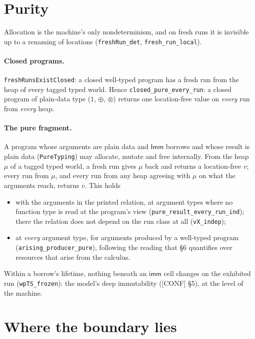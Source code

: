 \documentclass[10pt]{article}
\newcommand{\lean}[1]{\texttt{#1}}
\begin{document}
\section{Purity}

Allocation is the machine's only nondeterminism, and on fresh runs it is invisible up to a
renaming of locations (\lean{freshRun\_det}, \lean{fresh\_run\_local}).

\paragraph{Closed programs.} \lean{freshRunsExistClosed}: a closed well-typed program has a fresh
run from the heap of every tagged typed world. Hence \lean{closed\_pure\_every\_run}: a closed
program of plain-data type ($1$, $\oplus$, $\otimes$) returns one location-free value on
\emph{every} run from \emph{every} heap.

\paragraph{The pure fragment.} A program whose arguments are plain data and $\mathsf{Imm}$
borrows and whose result is plain data (\lean{PureTyping}) may allocate, mutate and free
internally. From the heap $\mu$ of a tagged typed world, a fresh run gives $\mu$ back and
returns a location-free $v$; every run from $\mu$, and every run from any heap agreeing with
$\mu$ on what the arguments reach, returns $v$. This holds
\begin{itemize}
\item with the arguments in the printed relation, at argument types where no function type is
  read at the program's view (\lean{pure\_result\_every\_run\_ind}); there the relation does not
  depend on the run class at all (\lean{vX\_indep});
\item at \emph{every} argument type, for arguments produced by a well-typed program
  (\lean{arising\_producer\_pure}), following the reading that \S6 quantifies over resources
  that arise from the calculus.
\end{itemize}
Within a borrow's lifetime, nothing beneath an $\mathsf{imm}$ cell changes on the exhibited run
(\lean{wpTS\_frozen}): the model's deep immutability (\textsc{[CONF]} \S5), at the level of
the machine.

\section{Where the boundary lies}
\end{document}
